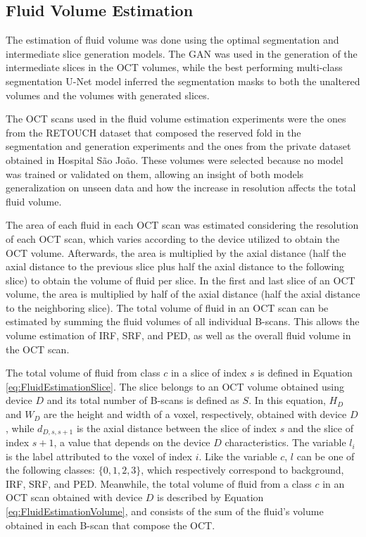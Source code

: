 \subsection{Fluid Volume Estimation}
The estimation of fluid volume was done using the optimal segmentation and intermediate slice generation models. The GAN was used in the generation of the intermediate slices in the OCT volumes, while the best performing multi-class segmentation U-Net model inferred the segmentation masks to both the unaltered volumes and the volumes with generated slices. 
\par
The OCT scans used in the fluid volume estimation experiments were the ones from the \hbox{RETOUCH} dataset that composed the reserved fold in the segmentation and generation experiments and the ones from the private dataset obtained in Hospital São João. These volumes were selected because no model was trained or validated on them, allowing an insight of both models generalization on unseen data and how the increase in resolution affects the total fluid volume.
\par
The area of each fluid in each OCT scan was estimated considering the resolution of each OCT scan, which varies according to the device utilized to obtain the OCT volume. Afterwards, the area is multiplied by the axial distance (half the axial distance to the previous slice plus half the axial distance to the following slice) to obtain the volume of fluid per slice. In the first and last slice of an OCT volume, the area is multiplied by half of the axial distance (half the axial distance to the neighboring slice). The total volume of fluid in an OCT scan can be estimated by summing the fluid volumes of all individual B-scans. This allows the volume estimation of IRF, SRF, and PED, as well as the overall fluid volume in the OCT scan.
\par
The total volume of fluid from class $c$ in a slice of index $s$ is defined in Equation \ref{eq:FluidEstimationSlice}. The slice belongs to an OCT volume obtained using device $D$ and its total number of B-scans is defined as $S$. In this equation, $H_{D}$ and $W_{D}$ are the height and width of a voxel, respectively, obtained with device $D$, while $d_{D,s,s+1}$ is the axial distance between the slice of index $s$ and the slice of index $s+1$, a value that depends on the device $D$ characteristics. The variable $l_{i}$ is the label attributed to the voxel of index $i$. Like the variable $c$, $l$ can be one of the following classes: $\{0,1,2,3\}$, which respectively correspond to background, IRF, SRF, and PED. Meanwhile, the total volume of fluid from a class $c$ in an OCT scan obtained with device $D$ is described by Equation \ref{eq:FluidEstimationVolume}, and consists of the sum of the fluid's volume obtained in each B-scan that compose the OCT.

